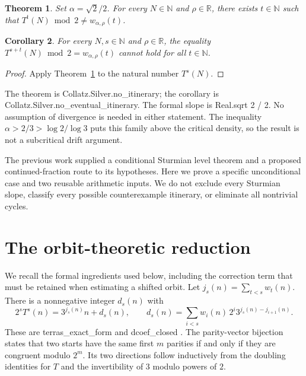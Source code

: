\documentclass[11pt]{article}
\newtheorem{theorem}{Theorem}[section]
\newtheorem{corollary}[theorem]{Corollary}
\theoremstyle{remark}
\newcommand{\N}{\mathbb N}
\newcommand{\R}{\mathbb R}
\newcommand{\code}[1]{{\small\ttfamily #1}}
\begin{document}
\begin{theorem}\label{thm:main}
Set $\alpha=\sqrt2/2$. For every $N\in\N$ and $\rho\in\R$, there exists
$t\in\N$ such that $T^t(N)\bmod2\ne w_{\alpha,\rho}(t)$.
\end{theorem}
\begin{corollary}\label{cor:tails}
For every $N,s\in\N$ and $\rho\in\R$, the equality
$T^{s+t}(N)\bmod2=w_{\alpha,\rho}(t)$ cannot hold for all $t\in\N$.
\end{corollary}
\begin{proof}
Apply Theorem~\ref{thm:main} to the natural number $T^s(N)$.
\end{proof}
The theorem is \code{Collatz.Silver.no\_\allowbreak{}itinerary}; the corollary is
\code{Collatz.Silver.no\_\allowbreak{}eventual\_\allowbreak{}itinerary}. The formal slope is
\code{Real.sqrt 2 / 2}. No assumption of divergence is needed in either
statement. The inequality $\alpha>2/3>\log 2/\log 3$ puts this family above
the critical density, so the result is not a subcritical drift argument.

The previous work \cite{rung1} supplied a conditional Sturmian level
theorem and a proposed continued-fraction route to its hypotheses.
Here we prove a specific unconditional case and two reusable arithmetic
inputs. We do not exclude every Sturmian slope, classify every possible
counterexample itinerary, or eliminate all nontrivial cycles.

\section{The orbit-theoretic reduction}
We recall the formal ingredients used below, including the correction
term that must be retained when estimating a shifted orbit.
Let $j_s(n)=\sum_{t<s}w_t(n)$. There is a nonnegative integer $d_s(n)$ with
\begin{equation}\label{eq:affine}
2^sT^s(n)=3^{j_s(n)}n+d_s(n),\qquad
 d_s(n)=\sum_{i<s}w_i(n)\,2^i3^{j_s(n)-j_{i+1}(n)}.
\end{equation}
These are \code{terras\_\allowbreak{}exact\_\allowbreak{}form} and \code{dcoef\_\allowbreak{}closed}
\cite{shadow,ladder}. The parity-vector bijection states that two starts
have the same first $m$ parities if and only if they are congruent modulo
$2^m$. Its two directions follow inductively from the doubling identities
for $T$ and the invertibility of $3$ modulo powers of $2$.
\end{document}
